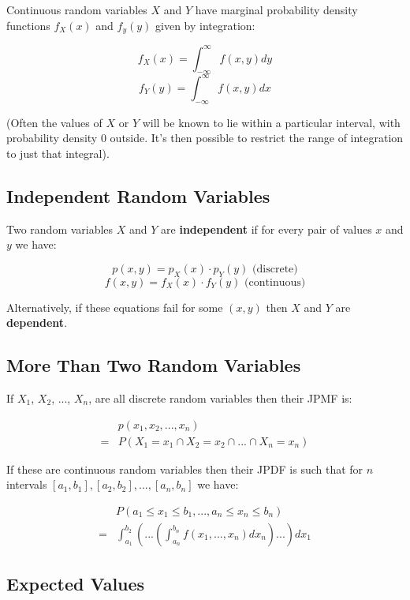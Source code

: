 Continuous random variables $X$ and $Y$ have marginal probability density functions $f_X(x)$ and $f_y(y)$ given by integration:

$$ f_X(x) = \int_{-\infty}^{\infty} f(x,y) dy $$
$$ f_Y(y) = \int_{-\infty}^{\infty} f(x,y) dx $$

(Often the values of $X$ or $Y$ will be known to lie within a particular interval, with probability density $0$ outside. It's then possible to restrict the range of integration to just that integral).

\subsection*{Independent Random Variables}

Two random variables $X$ and $Y$ are \textbf{independent} if for every pair of values $x$ and $y$ we have:

$$ p(x,y) = p_X(x) \cdot p_Y(y) \text{ (discrete)} $$
$$ f(x,y) = f_X(x) \cdot f_Y(y) \text{ (continuous)} $$

Alternatively, if these equations fail for some $(x,y)$ then $X$ and $Y$ are \textbf{dependent}.

\subsection*{More Than Two Random Variables}

If $X_1$, $X_2$, ..., $X_n$, are all discrete random variables then their JPMF is:

\begin{align*}
    & p(x_1,x_2,...,x_n)                            \\
  = & P(X_1=x_1 \cap X_2=x_2 \cap ... \cap X_n=x_n)
\end{align*}

If these are continuous random variables then their JPDF is such that for $n$ intervals $[a_1,b_1], [a_2,b_2],...,[a_n,b_n]$ we have:

\begin{align*}
    & P(a_1 \leq x_1 \leq b_1,...,a_n\leq x_n \leq b_n)                                      \\
  = & \int_{a_1}^{b_2}\left(...\left(\int_{a_n}^{b_n}f(x_1,...,x_n)dx_n\right)...\right)dx_1
\end{align*}

\subsection*{Expected Values}

